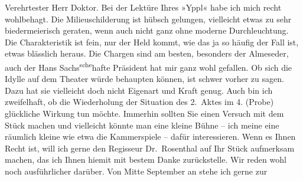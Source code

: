 \begin{ledgroupsized}[t]{13cm}
           \pstart\center{}Verehrtester Herr Doktor.\pend\pstart
           Bei der Lektüre Ihres »Yppl« habe ich mich recht
               wohlbehagt. Die Milieuschilderung ist hübsch gelungen, vielleicht etwas zu sehr
               biedermeierisch geraten, wenn auch nicht ganz ohne moderne Durchleuchtung. Die
               Charakteristik ist fein, nur der Held kommt, wie das ja so häufig der Fall ist, etwas
               blässlich heraus. Die Chargen sind am besten, besonders der Almeseder, auch der Hans Sachs\substVorne{}\textsuperscript{sche}\substDazwischen{}hafte\substHinten{} Präsident hat mir ganz wohl gefallen.\pend
           \pstart
           Ob sich die Idylle auf dem Theater würde behaupten können, ist schwer vorher zu
               sagen. Dazu hat sie vielleicht doch nicht Eigenart und Kraft genug. Auch bin ich
               zweifelhaft, ob die Wiederholung der Situation des 2. Aktes im 4. (Probe) glückliche
               Wirkung tun möchte. Immerhin sollten Sie einen Versuch mit dem {\pb}Stück machen und vielleicht
               könnte man eine kleine Bühne – ich meine eine räumlich kleine wie etwa die Kammerspiele – dafür interessieren. Wenn es Ihnen
               Recht ist, will ich gerne den Regisseur Dr. Rosenthal auf Ihr Stück
               aufmerksam machen, das ich Ihnen hiemit mit bestem Danke zurückstelle. Wir reden wohl
               noch ausführlicher darüber. Von Mitte September an stehe ich gerne zur

\end{ledgroupsized}
